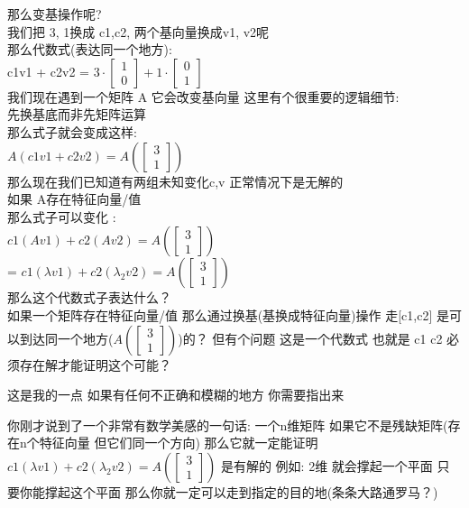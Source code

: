 \documentclass[12pt]{article}
\begin{document}
\begin{flushleft}
    那么变基操作呢? \\
    我们把 3, 1换成 c1,c2, 两个基向量换成v1, v2呢 \\
    那么代数式(表达同一个地方): \\
    c1v1 + c2v2  =  $ 3 \cdot \begin{bmatrix}
            1 \\
            0
        \end{bmatrix} + 1 \cdot \begin{bmatrix}
            0 \\
            1
        \end{bmatrix}$ \\
    我们现在遇到一个矩阵 A  它会改变基向量 这里有个很重要的逻辑细节: \\
    先换基底而非先矩阵运算 \\
    那么式子就会变成这样: \\
    $A(c1v1+ c2v2) = A(\begin{bmatrix}
            3 \\
            1
        \end{bmatrix}) $ \\
    那么现在我们已知道有两组未知变化c,v 正常情况下是无解的\\
    如果 A存在特征向量/值 \\
    那么式子可以变化 : \\
    $c1(Av1) + c2(Av2) = A(\begin{bmatrix}
            3 \\
            1
        \end{bmatrix}) $ \\
    = $c1(\lambda v1) + c2(\lambda_{2} v2) = A(\begin{bmatrix}
            3 \\
            1
        \end{bmatrix})$ \\
    那么这个代数式子表达什么？ \\
    如果一个矩阵存在特征向量/值 那么通过换基(基换成特征向量)操作 走[c1,c2]
    是可以到达同一个地方($A(\begin{bmatrix}
            3 \\
            1
        \end{bmatrix})$)的？
    但有个问题 这是一个代数式 也就是 c1 c2 必须存在解才能证明这个可能？

    这是我的一点 如果有任何不正确和模糊的地方 你需要指出来

    你刚才说到了一个非常有数学美感的一句话:
    一个n维矩阵 如果它不是残缺矩阵(存在n个特征向量 但它们同一个方向)
    那么它就一定能证明 $c1(\lambda v1) + c2(\lambda_{2} v2) = A(\begin{bmatrix}
            3 \\
            1
        \end{bmatrix})$ 是有解的 例如: 2维 就会撑起一个平面 只要你能撑起这个平面 那么你就一定可以走到指定的目的地(条条大路通罗马？)
\end{flushleft}
\end{document}
